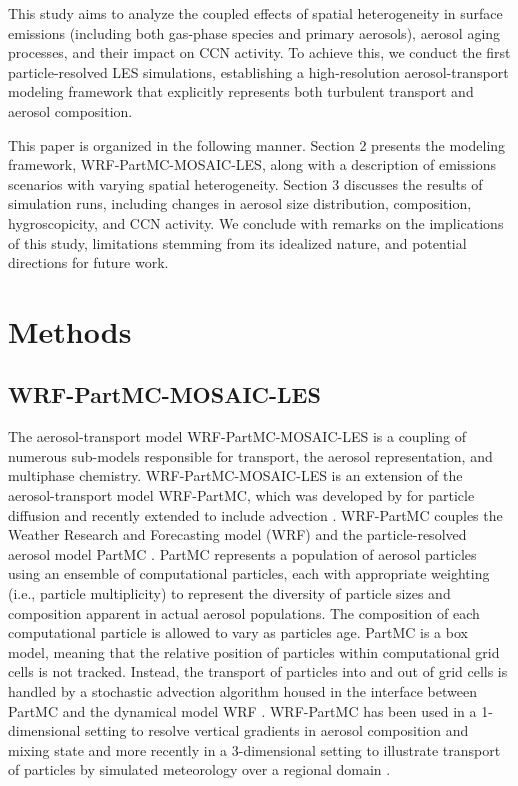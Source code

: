 \documentclass[journal abbreviation, manuscript]{copernicus}
\begin{document}
This study aims to analyze the coupled effects of spatial
heterogeneity in surface emissions (including both gas-phase species
and primary aerosols), aerosol aging processes, and their impact on
CCN activity. To achieve this, we conduct the first particle-resolved
LES simulations, establishing a high-resolution aerosol-transport
modeling framework that explicitly represents both turbulent transport
and aerosol composition.

This paper is organized in the following manner. Section 2 presents
the modeling framework, WRF-PartMC-MOSAIC-LES, along with a
description of emissions scenarios with varying spatial
heterogeneity. Section 3 discusses the results of simulation runs,
including changes in aerosol size distribution, composition,
hygroscopicity, and CCN activity. We conclude with remarks on the
implications of this study, limitations stemming from its idealized
nature, and potential directions for future work.

\section{Methods}

\subsection{WRF-PartMC-MOSAIC-LES}

The aerosol-transport model WRF-PartMC-MOSAIC-LES is a coupling of numerous sub-models responsible for transport, the aerosol representation, and multiphase chemistry. WRF-PartMC-MOSAIC-LES is an extension of the aerosol-transport model WRF-PartMC, which was developed by \citet{curtis_single-column_2017} for particle diffusion and recently extended to include advection \citep{gmd-17-8399-2024}. WRF-PartMC couples the Weather Research and Forecasting model (WRF) \citep{skamarock_description_2008} and the particle-resolved aerosol model PartMC \citep{riemer_simulating_2009}. PartMC represents a population of aerosol particles using an ensemble of computational particles, each with appropriate weighting (i.e., particle multiplicity) to represent the diversity of particle sizes and composition apparent in actual aerosol populations. The composition of each computational particle is allowed to vary as particles age. PartMC is a box model, meaning that the relative position of particles within computational grid cells is not tracked. Instead, the transport of particles into and out of grid cells is handled by a stochastic advection algorithm housed in the interface between PartMC and the dynamical model WRF \citep{gmd-17-8399-2024}. WRF-PartMC has been used in a 1-dimensional setting to resolve vertical gradients in aerosol composition and mixing state \citep {curtis_single-column_2017} and more recently in a 3-dimensional setting to illustrate transport of particles by simulated meteorology over a regional domain \citep{gmd-17-8399-2024}.
\end{document}
